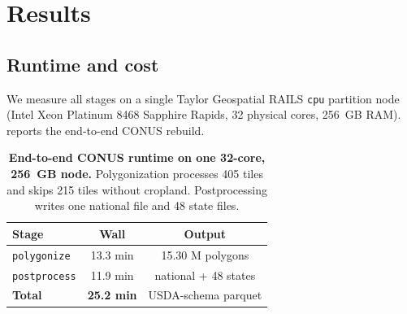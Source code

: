 \documentclass[preprint,12pt]{elsarticle}
\begin{document}
\section{Results}
\label{sec:results}

\subsection{Runtime and cost}
\label{sec:results-runtime}

We measure all stages on a single Taylor Geospatial RAILS \texttt{cpu} partition
node (Intel Xeon Platinum 8468 Sapphire Rapids, 32 physical cores,
256~GB RAM).  reports the end-to-end CONUS rebuild.

\begin{table}[t]
\centering
\caption{\textbf{End-to-end CONUS runtime on one 32-core, 256~GB node.}
Polygonization processes 405 tiles and skips 215 tiles without cropland.
Postprocessing writes one national file and 48 state files.}
\label{tab:runtime}
\small
\begin{tabular}{lcc}
\toprule
Stage & Wall & Output \\
\midrule
\texttt{polygonize}  & 13.3 min & 15.30 M polygons \\
\texttt{postprocess} & 11.9 min & national + 48 states \\
\midrule
\textbf{Total}       & \textbf{25.2 min} & USDA-schema parquet \\
\bottomrule
\end{tabular}
\end{table}
\end{document}

